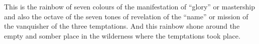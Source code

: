 \begin{quotex}
This is the rainbow of seven colours of the manifestation of ``glory'' or mastership and also the octave of the seven tones of revelation of the ``name'' or mission of the vanquisher of the three temptations. And this rainbow shone around the empty and somber place in the wilderness where the temptations took place. 

\end{quotex}

